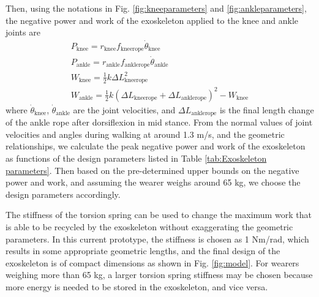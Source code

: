 \documentclass[10pt]{asme2ej}
\begin{document}
Then, using the notations in Fig. \ref{fig:kneeparameters} and \ref{fig:ankleparameters}, the negative power and work of the exoskeleton applied to the knee and ankle joints are
\begin{gather}
	P_\mathrm{knee} = r_\mathrm{knee}f_\mathrm{kneerope}\dot{\theta}_\mathrm{knee} \\
	P_\mathrm{ankle} = r_\mathrm{ankle}f_\mathrm{anklerope}\dot{\theta}_\mathrm{ankle} \\
	W_\mathrm{knee} = \frac{1}{2}k\Delta L_\mathrm{kneerope}^2 \\
	W_\mathrm{ankle} = \frac{1}{2}k(\Delta L_\mathrm{kneerope}+\Delta L_\mathrm{anklerope})^2 - W_\mathrm{knee}
\end{gather}
where $\dot{\theta}_\mathrm{knee}$, $\dot{\theta}_\mathrm{ankle}$ are the joint velocities, and $\Delta L_\mathrm{anklerope}$ is the final length change of the ankle rope after dorsiflexion in mid stance.
From the normal values of joint velocities and angles during walking at around 1.3 m/s, and the geometric relationships, we calculate the peak negative power and work of the exoskeleton as functions of the design parameters listed in Table \ref{tab:Exoskeleton parameters}.
Then based on the pre-determined upper bounds on the negative power and work, and assuming the wearer weighs around 65 kg, we choose the design parameters accordingly.




The stiffness of the torsion spring can be used to change the maximum work that is able to be recycled by the exoskeleton without exaggerating the geometric parameters.
In this current prototype, the stiffness is chosen as 1 Nm/rad, which results in some appropriate geometric lengths, and the final design of the exoskeleton is of compact dimensions as shown in Fig. \ref{fig:model}.
For wearers weighing more than 65 kg, a larger torsion spring stiffness may be chosen because more energy is needed to be stored in the exoskeleton, and vice versa.
\end{document}

